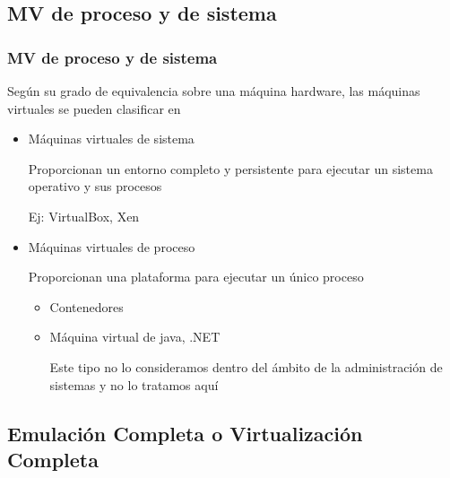 \documentclass[ucs]{beamer}
\begin{document}
\subsection{MV de proceso y de sistema}
\begin{frame}[fragile]
\frametitle{MV de proceso y de sistema}

Según su grado de equivalencia sobre una máquina hardware, las máquinas virtuales
se pueden clasificar en 
\begin{itemize}
\item
Máquinas virtuales de sistema

Proporcionan un entorno completo y persistente para ejecutar un sistema operativo y sus procesos

Ej: VirtualBox, Xen

\item
Máquinas virtuales de proceso

Proporcionan una plataforma para ejecutar un único proceso


\begin{itemize}
\item
Contenedores
\item
Máquina virtual de java, .NET

Este tipo no lo consideramos dentro del ámbito
de la administración de sistemas y no lo tratamos aquí
\end{itemize}




\end{itemize}

\end{frame}



\subsection{Emulación Completa o Virtualización Completa}
\end{document}
